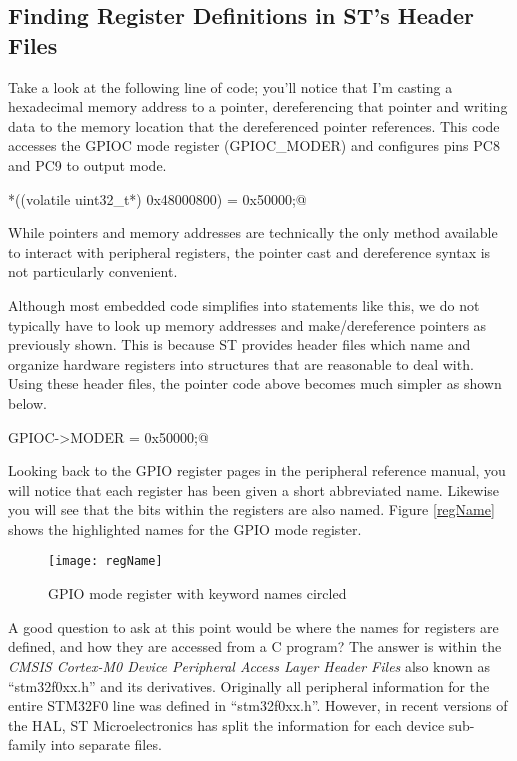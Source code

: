 \documentclass[11pt,fleqn]{book} %
\makeatletter
\newcommand{\ilcode}[1]{
    \begin{center} \parskip=-15pt \colorbox{gray!20!white}{
        \parbox{\columnwidth-2\fboxsep}{
            \lstinline@#1@
        }
    } \end{center}
}
\makeatother
\begin{document}
\subsection{Finding Register Definitions in ST's Header Files}

Take a look at the following line of code; you'll notice that I'm casting a hexadecimal memory address to a pointer, dereferencing that pointer and writing data to the memory location that the dereferenced pointer references. This code accesses the GPIOC mode register (GPIOC\_MODER) and configures pins PC8 and PC9 to output mode.

\ilcode{*((volatile uint32\_t*) 0x48000800) = 0x50000;}%
\smallskip

While pointers and memory addresses are technically the only method available to interact with peripheral registers, the pointer cast and dereference syntax is not particularly convenient.

Although most embedded code simplifies into statements like this, we do not typically have to look up memory addresses and make/dereference pointers as previously shown. This is because ST provides header files which name and organize hardware registers into structures that are reasonable to deal with. Using these header files, the pointer code above becomes much simpler as shown below.

\ilcode{GPIOC->MODER = 0x50000;}%
\smallskip


Looking back to the GPIO register pages in the peripheral reference manual, you will notice that each register has been given a short abbreviated name. Likewise you will see that the bits within the registers are also named. Figure \vref{regName} shows the highlighted names for the GPIO mode register. 

\begin{figure}[]
    \centering\texttt{[image: regName]}
    \caption{GPIO mode register with keyword names circled}
    \label{regName}
\end{figure}

A good question to ask at this point would be where the names for registers are defined, and how they are accessed from a C program? The answer is within the \textit{CMSIS Cortex-M0 Device Peripheral Access Layer Header Files} also known as ``stm32f0xx.h'' and its derivatives. Originally all peripheral information for the entire STM32F0 line was defined in ``stm32f0xx.h''. However, in recent versions of the HAL, ST Microelectronics has split the information for each device sub-family into separate files. 
\end{document}
